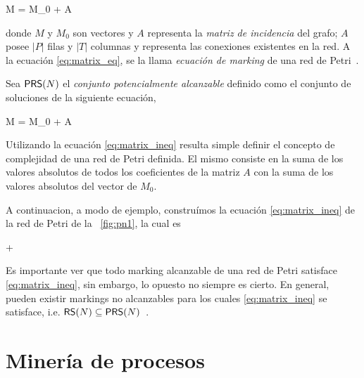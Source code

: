 M = M_0 + A \cdot \widehat\sigma 
\eequation

donde $M$ y $M_0$ son vectores y $A$ representa la \emph{matriz de incidencia}
del grafo; $A$ posee $|P|$ filas y $|T|$ columnas y representa las conexiones 
existentes en la red.
A la ecuación \eqref{eq:matrix_eq}, se la llama \emph{ecuación de marking} de una red
de Petri~\cite{Murata89}.

Sea $\textsf{PRS}(N)$ el \emph{conjunto potencialmente alcanzable}
definido como el conjunto de soluciones de la siguiente ecuación,

    M = M_0 + A \cdot \widehat\sigma {}
\eequation

Utilizando la ecuación \eqref{eq:matrix_ineq} resulta simple definir el concepto
de complejidad de una red de Petri definida. El mismo consiste en la suma
de los valores absolutos de todos los coeficientes de la matriz $A$ con la suma
de los valores absolutos del vector de $M_0$.

A continuacion, a modo de ejemplo, construímos la ecuación \eqref{eq:matrix_ineq} de
la red de Petri de la ~\autoref{fig:pn1}, la cual es

\bequation
 \left[\begin{array}{c} 1 \\ 6 \end{array} \right] +
\left[\begin{array}{rr} 1 & -1 \\ -2 & 3 \end{array} \right]
\cdot
{}
\geq \left[\begin{array}{c} 0 \\ 0 \end{array} \right]
\eequation

Es importante ver que todo marking alcanzable de una red de Petri
satisface \eqref{eq:matrix_ineq}, sin embargo, lo opuesto no siempre es cierto.
En general, pueden existir markings no alcanzables para
los cuales \eqref{eq:matrix_ineq} se satisface, i.e. $\textsf{RS}(N) \subseteq \textsf{PRS}(N)$~\cite{SilvaTC96}.

\section{Minería de procesos} 
\label{sec:2.process mining}

